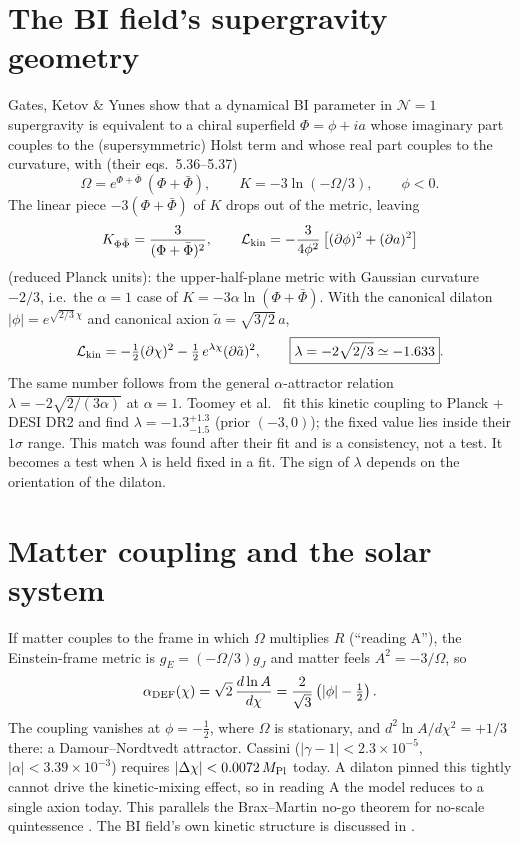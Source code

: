 \documentclass[11pt]{article}
\newcommand{\Mp}{M_{\rm Pl}}
\begin{document}
\section{The BI field's supergravity geometry}\label{sec:geometry}
Gates, Ketov \& Yunes \cite{gky2009} show that a dynamical BI parameter in $\mathcal N=1$ supergravity is
equivalent to a chiral superfield $\Phi=\phi+ia$ whose imaginary part couples to the (supersymmetric) Holst term and
whose real part couples to the curvature, with (their eqs.~5.36--5.37)
\begin{equation}
\Omega=e^{\Phi+\bar\Phi}\,(\Phi+\bar\Phi),\qquad K=-3\ln(-\Omega/3),\qquad \phi<0 .
\end{equation}
The linear piece $-3(\Phi+\bar\Phi)$ of $K$ drops out of the metric, leaving
\begin{equation}
K_{\Phi\bar\Phi}=\frac{3}{(\Phi+\bar\Phi)^2},\qquad
\mathcal L_{\rm kin}=-\frac{3}{4\phi^2}\left[(\partial\phi)^2+(\partial a)^2\right]
\end{equation}
(reduced Planck units): the upper-half-plane metric with Gaussian curvature $-2/3$, i.e.\ the $\alpha=1$ case of
$K=-3\alpha\ln(\Phi+\bar\Phi)$. With the canonical dilaton $|\phi|=e^{\sqrt{2/3}\,\chi}$ and canonical axion
$\tilde a=\sqrt{3/2}\,a$,
\begin{equation}
\mathcal L_{\rm kin}=-\tfrac12(\partial\chi)^2-\tfrac12\,e^{\lambda\chi}(\partial\tilde a)^2,\qquad
\boxed{\lambda=-2\sqrt{2/3}\simeq-1.633}.
\end{equation}
The same number follows from the general $\alpha$-attractor relation $\lambda=-2\sqrt{2/(3\alpha)}$
\cite{qalpha2026} at $\alpha=1$. Toomey et al.\ \cite{toomey2025} fit this kinetic coupling to Planck + DESI DR2
and find $\lambda=-1.3^{+1.3}_{-1.5}$ (prior $(-3,0)$); the fixed value lies inside their $1\sigma$ range. This match
was found after their fit and is a consistency, not a test. It becomes a test when $\lambda$ is held fixed in a fit.
The sign of $\lambda$ depends on the orientation of the dilaton.

\section{Matter coupling and the solar system}
If matter couples to the frame in which $\Omega$ multiplies $R$ (``reading A''), the Einstein-frame metric is
$g_E=(-\Omega/3)g_J$ and matter feels $A^2=-3/\Omega$, so
\begin{equation}
\alpha_{\rm DEF}(\chi)=\sqrt2\,\frac{d\ln A}{d\chi}=\frac{2}{\sqrt3}\left(|\phi|-\tfrac12\right).
\end{equation}
The coupling vanishes at $\phi=-\tfrac12$, where $\Omega$ is stationary, and $d^2\ln A/d\chi^2=+1/3$ there: a
Damour--Nordtvedt attractor. Cassini ($|\gamma-1|<2.3\times10^{-5}$, $|\alpha|<3.39\times10^{-3}$) requires
$|\Delta\chi|<0.0072\,\Mp$ today. A dilaton pinned this tightly cannot drive the kinetic-mixing effect, so in
reading A the model reduces to a single axion today. This parallels the Brax--Martin no-go theorem for no-scale quintessence
\cite{brax2007}. The BI field's own kinetic structure is discussed in \cite{taveras2008,calcagni2009}.
\end{document}
